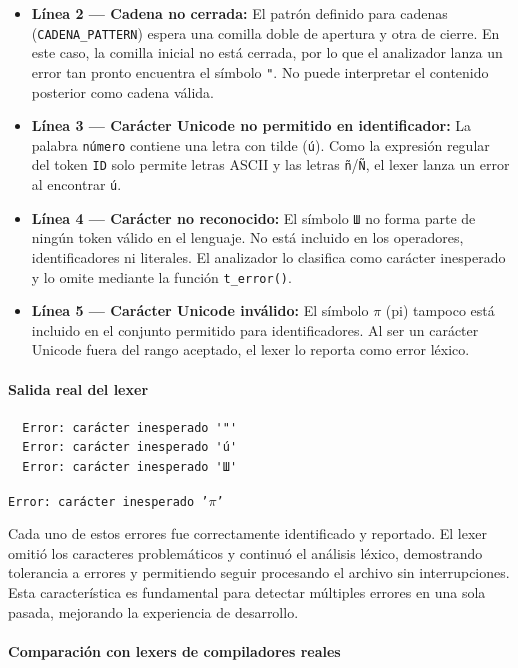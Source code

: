 \documentclass{article}
\begin{document}
\begin{itemize}
  \item \textbf{Línea 2 — Cadena no cerrada:} El patrón definido para cadenas (\texttt{CADENA\_PATTERN}) espera una comilla doble de apertura y otra de cierre. En este caso, la comilla inicial no está cerrada, por lo que el analizador lanza un error tan pronto encuentra el símbolo \texttt{"}. No puede interpretar el contenido posterior como cadena válida.

  \item \textbf{Línea 3 — Carácter Unicode no permitido en identificador:} La palabra \texttt{número} contiene una letra con tilde (\texttt{ú}). Como la expresión regular del token \texttt{ID} solo permite letras ASCII y las letras \texttt{ñ}/\texttt{Ñ}, el lexer lanza un error al encontrar \texttt{ú}.

  \item \textbf{Línea 4 — Carácter no reconocido:} El símbolo \texttt{Ш} no forma parte de ningún token válido en el 
  lenguaje. No está incluido en los operadores, identificadores ni literales. El analizador lo clasifica como carácter inesperado y 
  lo omite mediante la función \texttt{t\_error()}.

  \item \textbf{Línea 5 — Carácter Unicode inválido:} El símbolo $\pi$ (pi) tampoco está incluido en el conjunto permitido para identificadores. Al ser un carácter Unicode fuera del rango aceptado, el lexer lo reporta como error léxico.
\end{itemize}

\paragraph{Salida real del lexer}

\begin{verbatim}
  Error: carácter inesperado '"'
  Error: carácter inesperado 'ú'
  Error: carácter inesperado 'Ш'
\end{verbatim}
\noindent\texttt{Error: carácter inesperado '$\pi$'}


Cada uno de estos errores fue correctamente identificado y reportado. El lexer omitió los caracteres problemáticos y continuó el análisis léxico, demostrando tolerancia a errores y permitiendo seguir procesando el archivo sin interrupciones. Esta característica es fundamental para detectar múltiples errores en una sola pasada, mejorando la experiencia de desarrollo.

\paragraph{Comparación con lexers de compiladores reales}
\end{document}
